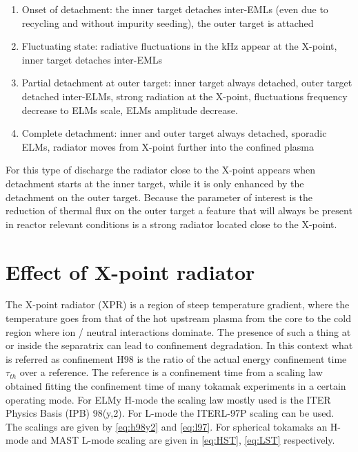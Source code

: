 \begin{enumerate}
    \item Onset of detachment: the inner target detaches inter-EMLs (even due to recycling and without impurity seeding), the outer target is attached
    \item Fluctuating state: radiative fluctuations in the kHz appear at the X-point, inner target detaches inter-EMLs
    \item Partial detachment at outer target: inner target always detached, outer target detached inter-ELMs, strong radiation at the X-point, fluctuations frequency decrease to ELMs scale, ELMs amplitude decrease.
    \item Complete detachment: inner and outer target always detached, sporadic ELMs, radiator moves from X-point further into the confined plasma
\end{enumerate}

For this type of discharge the radiator close to the X-point appears when detachment starts at the inner target, while it is only enhanced by the detachment on the outer target. Because the parameter of interest is the reduction of thermal flux on the outer target a feature that will always be present in reactor relevant conditions is a strong radiator located close to the X-point.

\section{Effect of X-point radiator}


The X-point radiator (XPR) is a region of steep temperature gradient, where the temperature goes from that of the hot upstream plasma from the core to the cold region where ion / neutral interactions dominate. The presence of such a thing at or inside the separatrix can lead to confinement degradation. In this context what is referred as confinement H98 is the ratio of the actual energy confinement time $\tau_{th}$ over a reference. The reference is a confinement time from a scaling law obtained fitting the confinement time of many tokamak experiments in a certain operating mode. For ELMy H-mode the scaling law mostly used is the ITER Physics Basis (IPB) 98(y,2).\cite{Doyle2007} For L-mode the ITERL-97P scaling can be used. \cite{Kaye1997} The scalings are given by \autoref{eq:h98y2} and \ref{eq:l97}. For spherical tokamaks an H-mode \cite{Kaye2006} and MAST L-mode \cite{Kaye2021} scaling are given in \autoref{eq:HST}, \ref{eq:LST} respectively.


